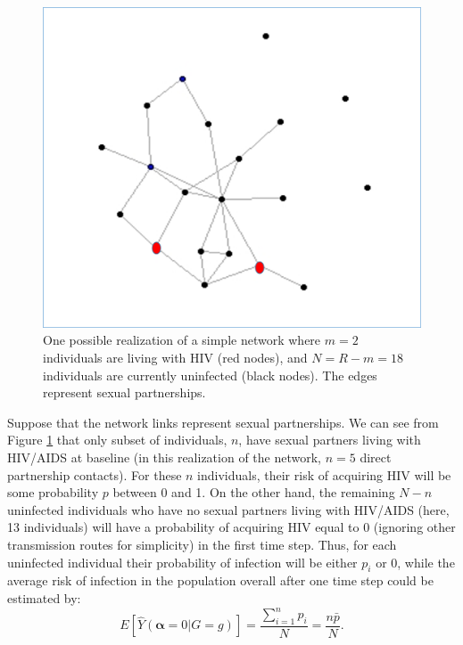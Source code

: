 \documentclass{article}
\theoremstyle{definition}
\begin{document}
\begin{figure}[H]
    \centering
    \includegraphics[scale=0.5]{Original Figures/Network Example 1.png}
    \caption{One possible realization of a simple network where $m = 2$ individuals are living with HIV (red nodes), and $N=R-m = 18$ individuals are currently uninfected (black nodes). The edges represent sexual partnerships.}
    \label{fig: Figure 2}
\end{figure}

Suppose that the network links represent sexual partnerships. We can see from Figure \ref{fig: Figure 2} that only subset of individuals, $n$, have sexual partners living with HIV/AIDS at baseline (in this realization of the network, $n=5$ direct partnership contacts). For these $n$ individuals, their risk of acquiring HIV will be some probability $p$ between 0 and 1. On the other hand, the remaining $N-n$ uninfected individuals who have no sexual partners living with HIV/AIDS (here, 13 individuals) will have a probability of acquiring HIV equal to 0 (ignoring other transmission routes for simplicity) in the first time step. Thus, for each uninfected individual their probability of infection will be either $p_i$ or 0, while the average risk of infection in the population overall after one time step could be estimated by:
\begin{equation}\label{eq:9}
E[\hat{Y}\left(\mathbf{\alpha} =0|G=g\right)]= \frac{\sum_{i=1}^{n}p_{i}}{N} = \frac{n\bar{p}}{N}.
\end{equation}
\end{document}
